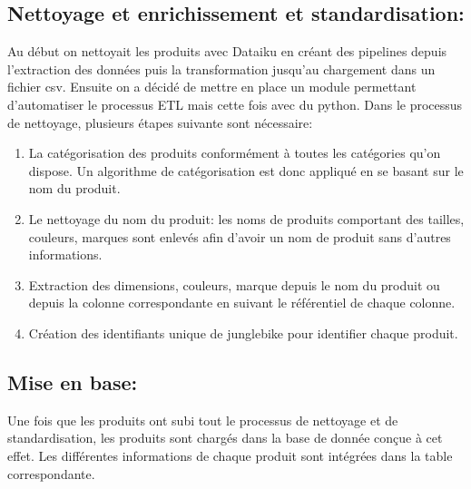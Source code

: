 \subsection{Nettoyage et enrichissement et standardisation:}
Au début on nettoyait les produits avec Dataiku en créant des pipelines depuis l’extraction des données puis la transformation jusqu’au chargement dans un fichier csv.
Ensuite on a décidé de mettre en place un module permettant d'automatiser le processus ETL mais cette fois avec du python. Dans le processus de nettoyage, plusieurs étapes suivante sont nécessaire:\\
\begin{enumerate}
\item La catégorisation des produits conformément à toutes les catégories qu’on dispose. Un algorithme de catégorisation est donc appliqué en se basant sur le nom du produit.
\item Le nettoyage du nom du produit: les noms de produits comportant des tailles, couleurs, marques sont enlevés afin d’avoir un nom de produit sans d’autres informations.
\item Extraction des dimensions, couleurs, marque depuis le nom du produit ou depuis la colonne correspondante en suivant le référentiel de chaque colonne.
\item Création des identifiants unique de junglebike pour identifier chaque produit.
\end{enumerate}

\subsection{Mise en base:}
Une fois que les produits ont subi tout le processus de nettoyage et de standardisation, les produits sont chargés dans la base de donnée conçue à cet effet. Les différentes informations de chaque produit sont intégrées dans la table correspondante.
